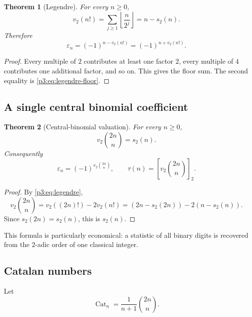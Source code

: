 \documentclass[11pt,oneside]{article}
\newtheorem{theorem}{Theorem}[section]
\theoremstyle{definition}
\theoremstyle{remark}
\newcommand{\vtwo}{v_2}
\newcommand{\bitsum}{s_2}
\newcommand{\eps}{\varepsilon}
\newcommand{\floor}[1]{\left\lfloor #1\right\rfloor}
\newcommand{\res}[2]{\left[#1\right]_{#2}}
\newcommand{\Cat}{\operatorname{Cat}}
\begin{document}
\begin{theorem}[Legendre]\label{p3:thm:legendre}
For every $n\ge0$,
\begin{equation}\label{p3:eq:legendre}
 \vtwo(n!)=\sum_{j\ge1}\floor{\frac n{2^j}}=n-\bitsum(n).
\end{equation}
Therefore
\begin{equation}\label{p3:eq:factorial-sign}
 \eps_n=(-1)^{n-\vtwo(n!)}=(-1)^{n+\vtwo(n!)}.
\end{equation}
\end{theorem}

\begin{proof}
Every multiple of $2$ contributes at least one factor $2$, every multiple of
$4$ contributes one additional factor, and so on.  This gives the floor sum.
The second equality is \cref{p3:eq:legendre-floor}.
\end{proof}

\subsection{A single central binomial coefficient}

\begin{theorem}[Central-binomial valuation]\label{p3:thm:central-binomial}
For every $n\ge0$,
\begin{equation}\label{p3:eq:central-binomial-v2}
 \vtwo\binom{2n}{n}=\bitsum(n).
\end{equation}
Consequently
\begin{equation}\label{p3:eq:central-binomial-thue-morse}
 \boxed{\ \eps_n=(-1)^{\vtwo\binom{2n}{n}},\qquad
 \tau(n)=\res{\vtwo\binom{2n}{n}}{2}.\ }
\end{equation}
\end{theorem}

\begin{proof}
By \cref{p3:eq:legendre},
\[
 \vtwo\binom{2n}{n}
 =\vtwo((2n)!)-2\vtwo(n!)
 =(2n-\bitsum(2n))-2(n-\bitsum(n)).
\]
Since $\bitsum(2n)=\bitsum(n)$, this is $\bitsum(n)$.
\end{proof}

This formula is particularly economical: a statistic of all binary digits is
recovered from the $2$-adic order of one classical integer.

\subsection{Catalan numbers}

Let
\[
 \Cat_n=\frac1{n+1}\binom{2n}{n}.
\]
\end{document}
